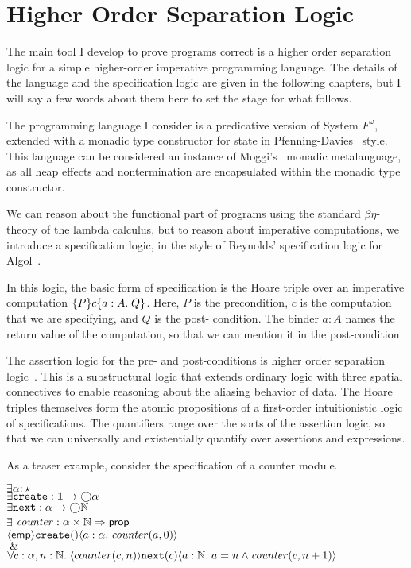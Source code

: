 \section{Higher Order Separation Logic}

The main tool I develop to prove programs correct is a higher order
separation logic for a simple higher-order imperative programming
language. The details of the language and the specification logic are
given in the following chapters, but I will say a few words about them
here to set the stage for what follows.

The programming language I consider is a predicative version of System
$F^\omega$, extended with a monadic type constructor for state in
Pfenning-Davies~\cite{pfenning-davies} style. This language can be
considered an instance of Moggi's~\cite{moggi} monadic metalanguage,
as all heap effects and nontermination are encapsulated within the
monadic type constructor.

We can reason about the functional part of programs using the standard
$\beta\eta$-theory of the lambda calculus, but to reason about
imperative computations, we introduce a specification logic, in the
style of Reynolds' specification logic for Algol~\citep{spec-logic}.

In this logic, the basic form of specification is the Hoare triple
over an imperative computation $\{{P}\}{c}\{{a:A}.\;{Q}\}$. Here, $P$ is the
precondition, $c$ is the computation that we are specifying, and $Q$
is the post- condition. The binder $a:A$ names the return value of the
computation, so that we can mention it in the post-condition.

The assertion logic for the pre- and post-conditions is higher order
separation logic~\citep{hosl}. This is a substructural logic that
extends ordinary logic with three spatial connectives to enable
reasoning about the aliasing behavior of data. The Hoare triples
themselves form the atomic propositions of a first-order
intuitionistic logic of specifications. The quantifiers range over the
sorts of the assertion logic, so that we can universally and
existentially quantify over assertions and expressions.

As a teaser example, consider the specification of a counter module.

\begin{tabbing}
$\exists \alpha : \star$ \\
$\exists \mathtt{create} : \mathbf{1} \to \bigcirc{\alpha}$ \\
$\exists \mathtt{next} : \alpha \to \bigcirc{\mathbb{N}}$ \\
$\exists $\= $\mathit{counter} : \alpha \times \mathbb{N} \Rightarrow \mathsf{prop}$ \\
\> $\langle{\mathsf{emp}}\rangle{\mathtt{create}()}\langle{a:\alpha}.\;{\mathit{counter}(a, 0)}\rangle$ \\
\> $\;\&\;$ \\
\> $\forall c:\alpha, n:\mathbb{N}.\; \langle{counter(c, n)}\rangle{\mathtt{next}(c)}\langle{a:\mathbb{N}}.\;{a = n \land \mathit{counter}(c, n+1)}\rangle$
\\
\end{tabbing} 

